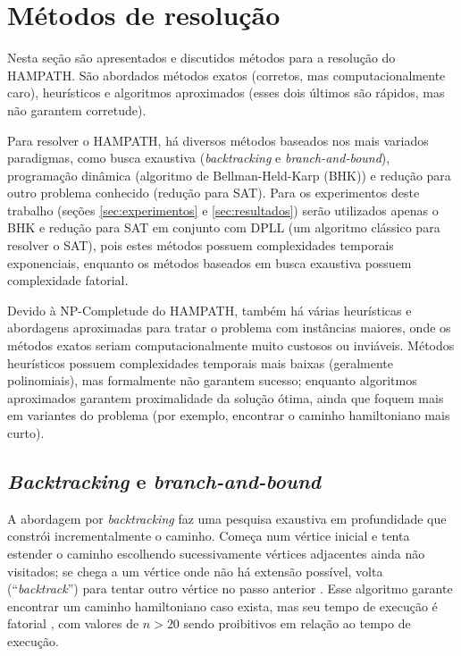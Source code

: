 \section{Métodos de resolução} \label{sec:metodos-resolucao}

Nesta seção são apresentados e discutidos métodos para a resolução do HAMPATH. São abordados métodos exatos (corretos, mas computacionalmente caro), heurísticos e algoritmos aproximados (esses dois últimos são rápidos, mas não garantem corretude).

Para resolver o HAMPATH, há diversos métodos baseados nos mais variados paradigmas, como busca exaustiva (\textit{backtracking} e \textit{branch-and-bound}), programação dinâmica (algoritmo de Bellman-Held-Karp (BHK)) e redução para outro problema conhecido (redução para SAT). Para os experimentos deste trabalho (seções \ref{sec:experimentos} e \ref{sec:resultados}) serão utilizados apenas o BHK e redução para SAT em conjunto com DPLL (um algoritmo clássico para resolver o SAT), pois estes métodos possuem complexidades temporais exponenciais, enquanto os métodos baseados em busca exaustiva possuem complexidade fatorial.

Devido à NP-Completude do HAMPATH, também  há várias heurísticas e abordagens aproximadas para tratar o problema com instâncias maiores, onde os métodos exatos seriam computacionalmente muito custosos ou inviáveis. Métodos heurísticos possuem complexidades temporais mais baixas (geralmente polinomiais), mas formalmente não garantem sucesso; enquanto algoritmos aproximados garantem proximalidade da solução ótima, ainda que foquem mais em variantes do problema (por exemplo, encontrar o caminho hamiltoniano mais curto).


\subsection{\textit{Backtracking} e \textit{branch-and-bound}} \label{subsec:backtracking_e_bb}

A abordagem por \textit{backtracking} faz uma pesquisa exaustiva em profundidade que constrói incrementalmente o caminho. Começa num vértice inicial e tenta estender o caminho escolhendo sucessivamente vértices adjacentes ainda não visitados; se chega a um vértice onde não há extensão possível, volta (``\textit{backtrack}'') para tentar outro vértice no passo anterior \cite{geeksforgeeks2025}. Esse algoritmo garante encontrar um caminho hamiltoniano caso exista, mas seu tempo de execução é fatorial \cite{geeksforgeeks2025}, com valores de $n>20$ sendo proibitivos em relação ao tempo de execução.

